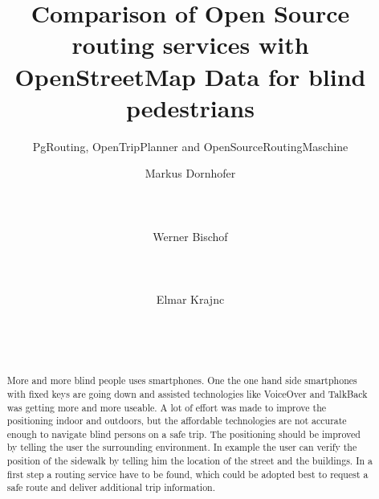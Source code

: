 \documentclass{sig-alternate}
\begin{document}
%

\title{Comparison of Open Source routing services with OpenStreetMap Data for blind pedestrians}
\subtitle{PgRouting, OpenTripPlanner and OpenSourceRoutingMaschine}


\author{
\alignauthor Markus Dornhofer\\
       \\
       \\
       \\
\alignauthor Werner Bischof\\
       \\
       \\
       \\
\alignauthor Elmar Krajnc\\
       \\
       \\
       \\
}

\maketitle

\begin{abstract}
More and more blind people uses smartphones. One the one hand side smartphones with fixed keys are going down and assisted technologies like VoiceOver and TalkBack was getting more and more useable. A lot of effort was made to improve the positioning indoor and outdoors, but the affordable technologies are not accurate enough to navigate blind persons on a safe trip. The positioning should be improved by telling the user the surrounding environment. In example the user can verify the position of the sidewalk by telling him the location of the street and the buildings. In a first step a routing service have to be found, which could be adopted best to request a safe route and deliver additional trip information.
\end{abstract}
\end{document}
